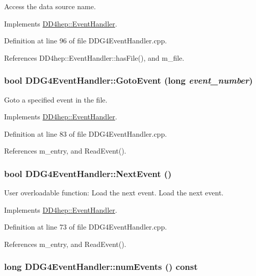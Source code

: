 Access the data source name. 

Implements \hyperlink{class_d_d4hep_1_1_event_handler_a5fa231363a787ba7edf520b5a99f294e}{DD4hep::EventHandler}.

Definition at line 96 of file DDG4EventHandler.cpp.

References DD4hep::EventHandler::hasFile(), and m\_\-file.\hypertarget{class_d_d4hep_1_1_d_d_g4_event_handler_a3af4cf3191fabf450e81812e93d2502a}{
\subsubsection[{GotoEvent}]{\setlength{\rightskip}{0pt plus 5cm}bool DDG4EventHandler::GotoEvent (long {\em event\_\-number})}}
\label{class_d_d4hep_1_1_d_d_g4_event_handler_a3af4cf3191fabf450e81812e93d2502a}


Goto a specified event in the file. 

Implements \hyperlink{class_d_d4hep_1_1_event_handler_a09c40b0b753455c1e3df7c561ff6b069}{DD4hep::EventHandler}.

Definition at line 83 of file DDG4EventHandler.cpp.

References m\_\-entry, and ReadEvent().\hypertarget{class_d_d4hep_1_1_d_d_g4_event_handler_a02ecd0dfced58988ab84242cb9fdfd44}{
\subsubsection[{NextEvent}]{\setlength{\rightskip}{0pt plus 5cm}bool DDG4EventHandler::NextEvent ()}}
\label{class_d_d4hep_1_1_d_d_g4_event_handler_a02ecd0dfced58988ab84242cb9fdfd44}


User overloadable function: Load the next event. Load the next event. 

Implements \hyperlink{class_d_d4hep_1_1_event_handler_ac2360791d3a44f4cef0987f9a7ec51ce}{DD4hep::EventHandler}.

Definition at line 73 of file DDG4EventHandler.cpp.

References m\_\-entry, and ReadEvent().\hypertarget{class_d_d4hep_1_1_d_d_g4_event_handler_a0c0858e77b1bb47621738694c31d5ed6}{
\subsubsection[{numEvents}]{\setlength{\rightskip}{0pt plus 5cm}long DDG4EventHandler::numEvents () const}}
\label{class_d_d4hep_1_1_d_d_g4_event_handler_a0c0858e77b1bb47621738694c31d5ed6}


